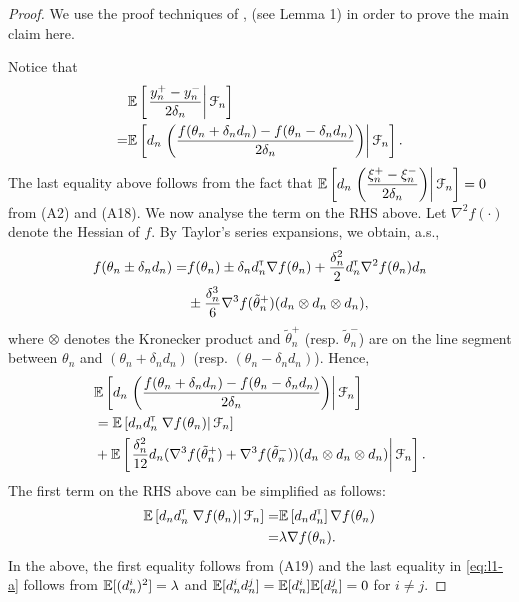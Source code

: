 \begin{proof}
We use the proof techniques of \cite{spall},\cite{prashanth2015rdsa} (see Lemma 1) in order to prove the main claim here.
 
Notice that
\begin{align*}
&\mathbb{E}\left[\left.\dfrac{y_n^+ - y_n^-}{2\delta_n} \right| \mathcal{F}_n\right] \\
= & \mathbb{E}\left[d_n\left.\left(\dfrac{f(\theta_n+\delta_n d_n) - f(\theta_n-\delta_n d_n)}{2\delta_n}\right) \right| \mathcal{F}_n\right].
\end{align*}
The last equality above follows from the fact that $\mathbb{E}\left[  d_n\left.\left(\dfrac{\xi_n^+ - \xi_n^-}{2\delta_n}\right) \right| \mathcal{F}_n\right]=0$ from (A2) and (A18). We now analyse the term on the RHS above.
Let $\nabla^2 f(\cdot)$ denote the Hessian of $f$.
By Taylor's series expansions, we obtain, a.s.,
\begin{align*}
f(\theta_n \pm \delta_n d_n) =& f(\theta_n) \pm \delta_n d_n^\mathsf{\scriptscriptstyle T} \nabla f(\theta_n) + \frac{\delta_n^2}{2} d_n^\mathsf{\scriptscriptstyle T} \nabla^2 f(\theta_n) d_n \\
& \pm  \frac{\delta_n^3}{6} \nabla^3 f(\tilde  \theta_n^+)(d_n \otimes d_n \otimes d_n),
\end{align*}
where $\otimes$ denotes the Kronecker product and $\tilde \theta_n^+$ (resp. $\tilde \theta_n^-$) are on the line segment between $\theta_n$ and $(\theta_n + \delta_n d_n)$ (resp. $(\theta_n - \delta_n d_n)$).
Hence,
\begin{align}
&\mathbb{E}\left[d_n\left.\left(\dfrac{f(\theta_n+\delta_n d_n) - f(\theta_n-\delta_n d_n)}{2\delta_n}\right)\right| \mathcal{F}_n \right] \nonumber\\
&= \mathbb{E}\left[d_n d_n^\mathsf{\scriptscriptstyle T} \left.\nabla f(\theta_n)\right| \mathcal{F}_n\right]\nonumber \\
& +   \mathbb{E}\left[\left.\frac{\delta_n^2}{12} d_n (\nabla^3 f(\tilde  \theta_n^+)+\nabla^3 f(\tilde  \theta_n^-))(d_n \otimes d_n \otimes d_n)\right| \mathcal{F}_n\right]. \label{eq:l1}
\end{align}
The first term on the RHS above can be simplified as follows:
\begin{align}
\mathbb{E}\left[d_n d_n^\mathsf{\scriptscriptstyle T} \left.\nabla f(\theta_n)\right| \mathcal{F}_n\right] = &\mathbb{E}\left[d_n d_n^\mathsf{\scriptscriptstyle T} \right] \nabla f(\theta_n) \nonumber\\
= &  \lambda \nabla f(\theta_n). \label{eq:l1-a}
\end{align}
In the above, the first equality follows from (A19) and the last equality in \eqref{eq:l1-a} follows from $\mathbb{E}[(d_n^i)^2] = \lambda$ and $\mathbb{E}[d_n^i d_n^j] = \mathbb{E}[d_n^i] \mathbb{E}[d_n^j] = 0$ for $i\ne j$.


\end{proof}

